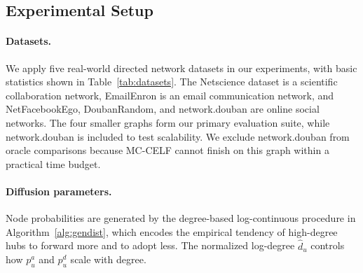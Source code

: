 \documentclass[sigconf]{acmart}
\begin{document}
\subsection{Experimental Setup}
\label{sec:exp-setup}

\paragraph{Datasets.}
We apply five real-world directed network datasets in our experiments,
with basic statistics shown in Table~\ref{tab:datasets}.
The Netscience dataset is a scientific collaboration network, EmailEnron
is an email communication network, and NetFacebookEgo, DoubanRandom, and
network.douban are online social networks.
The four smaller graphs form our primary evaluation suite, while
network.douban is included to test scalability.
We exclude network.douban from oracle comparisons because MC-CELF cannot
finish on this graph within a practical time budget.

\begin{table}[t]
  \caption{Datasets used in the experiments.}
  \label{tab:datasets}
  \centering
\end{table}

\paragraph{Diffusion parameters.}
Node probabilities are generated by the degree-based log-continuous
procedure in Algorithm~\ref{alg:gendist}, which encodes the empirical
tendency of high-degree hubs to forward more and to adopt less.
The normalized log-degree $\hat{d}_u$ controls how $p_u^a$ and $p_u^d$
scale with degree.
\end{document}
